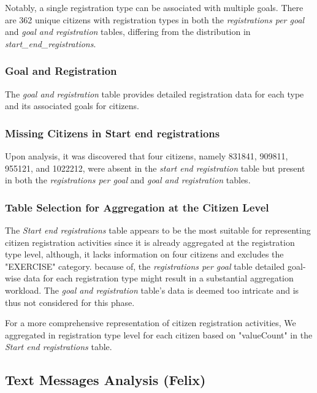 \documentclass[12pt]{article}
\begin{document}
Notably, a single registration type can be associated with multiple goals. There are 362 unique citizens with registration types in both the \textit{registrations per goal} and \textit{goal and registration} tables, differing from the distribution in \textit{start\_end\_registrations}.

\subsubsection{Goal and Registration}
The \textit{goal and registration} table provides detailed registration data for each type and its associated goals for citizens.

\subsubsection{Missing Citizens in Start end registrations}
Upon analysis, it was discovered that four citizens, namely 831841, 909811, 955121, and 1022212, were absent in the \textit{start end registration} table but present in both the \textit{registrations per goal} and \textit{goal and registration} tables.

\subsubsection{Table Selection for Aggregation at the Citizen Level}
The \textit{Start end registrations} table appears to be the most suitable for representing citizen registration activities since it is already aggregated at the registration type level, although, it lacks information on four citizens and excludes the "EXERCISE" category. because of, the \textit{registrations per goal} table detailed goal-wise data for each registration type might result in a substantial aggregation workload. The \textit{goal and registration} table's data is deemed too intricate and is thus not considered for this phase.

For a more comprehensive representation of citizen registration activities, 
We aggregated in registration type level for each citizen based on "valueCount"  
in the \textit{Start end registrations} table.


\subsection{Text Messages Analysis (Felix)}
\end{document}
